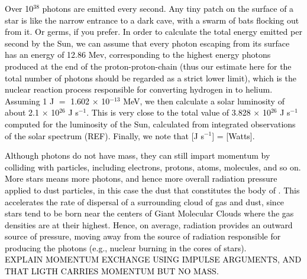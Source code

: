 \documentclass[main.tex]{subfiles}
\begin{document}
\begin{tcolorbox}[sharp corners, colback=blue!30, colframe=blue!80!blue, title=Box \refstepcounter{educhap1}\label{boxchap1:vt}\ref{boxchap1:vt} -- Virial Theorem]
\par \textcolor{black} {Over 10$^{38}$ photons are emitted every second.  Any tiny patch on the surface of a star is like the narrow entrance to a dark cave, with a swarm of bats flocking out from it.  Or germs, if you prefer.  In order to calculate the total energy emitted per second by the Sun, we can assume that every photon escaping from its surface has an energy of 12.86 Mev, corresponding to the highest energy photons produced at the end of the proton-proton-chain (thus our estimate here for the total number of photons should be regarded as a strict lower limit), which is the nuclear reaction process responsible for converting hydrogen in to helium.  Assuming 1 J $=$ 1.602 $\times$ 10$^{-13}$ MeV, we then calculate a solar luminosity of about 2.1 ${\times}$ 10$^{26}$ J s$^{-1}$.  This is very close to the total value of 3.828 $\times$ 10$^{26}$ J s$^{-1}$ computed for the luminosity of the Sun, calculated from integrated observations of the solar spectrum (REF). Finally, we note that [J s$^{-1}$] = [Watts].}  
\end{tcolorbox}

\begin{tcolorbox}[sharp corners, colback=green!30, colframe=green!80!blue, title=Box \refstepcounter{educhap1}\label{boxchap1:radpress}\ref{boxchap1:radpress} -- Radiation Pressure]
\par \textcolor{black} {Although photons do not have mass, they can still impart momentum by colliding with particles, including electrons, protons, atoms, molecules, and so on.  More stars means more photons, and hence more overall radiation pressure applied to dust particles, in this case the dust that constitutes the body of \rmpleione.  This accelerates the rate of dispersal of a surrounding cloud of gas and dust, since stars tend to be born near the centers of Giant Molecular Clouds where the gas densities are at their highest.  Hence, on average, radiation provides an outward source of pressure, moving away from the source of radiation responsible for producing the photons (e.g., nuclear burning in the cores of stars). \\
EXPLAIN MOMENTUM EXCHANGE USING IMPULSE ARGUMENTS, AND THAT LIGTH CARRIES MOMENTUM BUT NO MASS.}  %
\end{tcolorbox}
\end{document}
